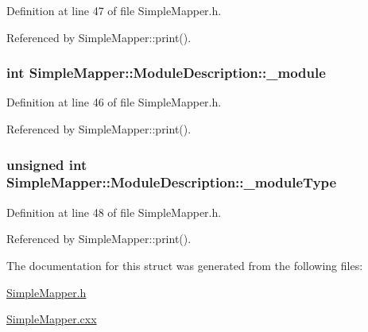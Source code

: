 Definition at line 47 of file Simple\-Mapper.\-h.



Referenced by Simple\-Mapper\-::print().

\hypertarget{struct_simple_mapper_1_1_module_description_a911114d3bb45d3b400e62889725e2480}{
\subsubsection[{\-\_\-module}]{\setlength{\rightskip}{0pt plus 5cm}int Simple\-Mapper\-::\-Module\-Description\-::\-\_\-module}}\label{struct_simple_mapper_1_1_module_description_a911114d3bb45d3b400e62889725e2480}


Definition at line 46 of file Simple\-Mapper.\-h.



Referenced by Simple\-Mapper\-::print().

\hypertarget{struct_simple_mapper_1_1_module_description_afcf7709bc493381c3fbd78925fe07a46}{
\subsubsection[{\-\_\-module\-Type}]{\setlength{\rightskip}{0pt plus 5cm}unsigned int Simple\-Mapper\-::\-Module\-Description\-::\-\_\-module\-Type}}\label{struct_simple_mapper_1_1_module_description_afcf7709bc493381c3fbd78925fe07a46}


Definition at line 48 of file Simple\-Mapper.\-h.



Referenced by Simple\-Mapper\-::print().



The documentation for this struct was generated from the following files\-:\begin{DoxyCompactItemize}
\item 
\hyperlink{_simple_mapper_8h}{Simple\-Mapper.\-h}\item 
\hyperlink{_simple_mapper_8cxx}{Simple\-Mapper.\-cxx}\end{DoxyCompactItemize}
